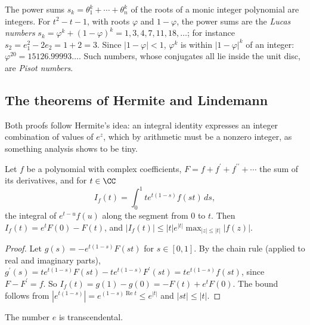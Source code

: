 \begin{example}\label{continued-fractions:example-symmetric}
The power sums $s_k = \theta_1^k + \cdots + \theta_n^k$ of the roots of a monic integer polynomial are integers. For $t^2 - t - 1$, with roots $\varphi$ and $1 - \varphi$, the power sums are the
\emph{Lucas numbers} $s_k = \varphi^k + (1 - \varphi)^k = 1, 3, 4, 7, 11, 18, \ldots$; for instance $s_2 = e_1^2 - 2e_2 = 1 + 2 = 3$. Since $|1 - \varphi| < 1$, $\varphi^k$ is within
$|1 - \varphi|^k$ of an integer: $\varphi^{20} = 15126.99993\ldots$. Such numbers, whose conjugates all lie inside the unit disc, are \emph{Pisot numbers}.
\end{example}

\subsection{The theorems of Hermite and Lindemann}\label{continued-fractions:subsection-e-pi}

Both proofs follow Hermite's idea: an integral identity expresses an integer combination of values of $e^z$, which by arithmetic must be a nonzero integer, as something analysis shows to be tiny.

\begin{lemma}\label{continued-fractions:lemma-hermite}
Let $f$ be a polynomial with complex coefficients, $F = f + f^{\prime} + f^{\prime\prime} + \cdots$ the sum of its derivatives, and for $t \in \CC$
\[
I_f(t) = \int_0^1 te^{t(1 - s)}f(st)\,ds,
\]
the integral of $e^{t - u}f(u)$ along the segment from $0$ to $t$. Then $I_f(t) = e^tF(0) - F(t)$, and $|I_f(t)| \leq |t|e^{|t|}\max_{|z| \leq |t|}|f(z)|$.
\end{lemma}

\begin{proof}
Let $g(s) = -e^{t(1 - s)}F(st)$ for $s \in [0, 1]$. By the chain rule (applied to real and imaginary parts),
$g^{\prime}(s) = te^{t(1 - s)}F(st) - te^{t(1 - s)}F^{\prime}(st) = te^{t(1 - s)}f(st)$, since $F - F^{\prime} = f$. So $I_f(t) = g(1) - g(0) = -F(t) + e^tF(0)$. The bound follows from
$|e^{t(1 - s)}| = e^{(1 - s)\operatorname{Re}t} \leq e^{|t|}$ and $|st| \leq |t|$.
\end{proof}

\begin{theorem}[Hermite, 1873]\label{continued-fractions:theorem-e-transcendental}
The number $e$ is transcendental.
\end{theorem}

